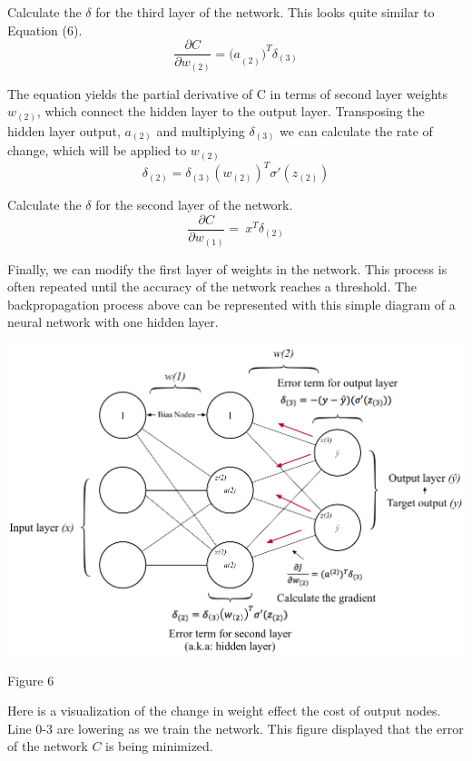 \documentclass[]{article}
\begin{document}
\begin{multicols}{2}
Calculate the \(\delta\) for the third layer of the network. This looks quite similar to Equation (6).
\[\frac{\partial C}{\partial w_{(2)}} = {{(a}_{(2)})}^{T}\delta_{(3)}\]

The equation yields the partial derivative of C in terms of second layer weights \(w_{(2)}\), which connect the hidden layer to the output layer. Transposing the hidden layer output, \(a_{(2)}\) and multiplying \(\delta_{(3)}\) we can calculate the rate of change, which will be applied to \(w_{(2)}\)
\[\delta_{(2)} = \delta_{\left( 3 \right)}\left( w_{\left( 2 \right)} \right)^{T}\sigma'(z_{(2)})\]

Calculate the \(\delta\) for the second layer of the network.
\[\frac{\partial C}{\partial w_{(1)}} = \ x^{T}\delta_{(2)}\]

Finally, we can modify the first layer of weights in the network. This
process is often repeated until the accuracy of the network reaches a
threshold. The backpropagation process above can be represented with this simple diagram of a neural network with one hidden layer. 

\centerline{\includegraphics[width=1\linewidth]{nnbp} }
\centerline{Figure 6}
\vspace{0.5cm}

Here is a visualization of the change in weight effect the cost of output nodes. Line 0-3 are lowering as we train the network. This figure displayed that the error of the network \(C\) is being minimized. 


\end{multicols}
\end{document}
